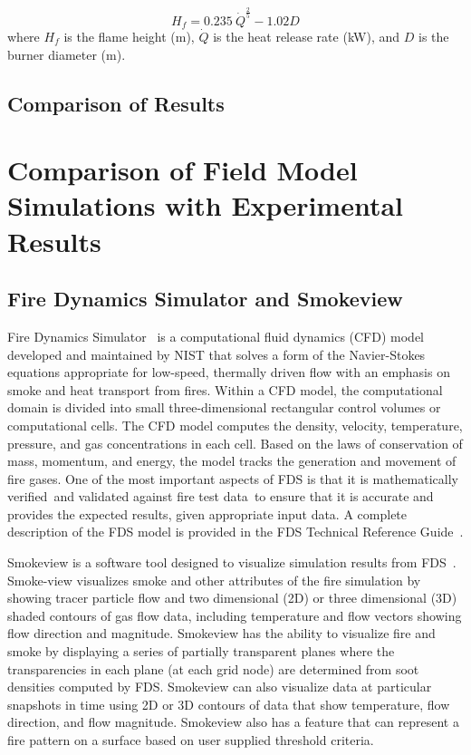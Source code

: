 \documentclass[twoside]{uocthesis}
\begin{document}
\begin{equation}\label{eq:flame_height}
H_f = 0.235\: \dot{Q}^{\frac{2}{5}} - 1.02 D
\end{equation}
where $H_{f}$ is the flame height (m), $\dot{Q}$ is the heat release rate (kW), and $D$ is the burner diameter (m).


\section{Comparison of Results}

\chapter{Comparison of Field Model Simulations with Experimental Results}

\section{Fire Dynamics Simulator and Smokeview}

Fire Dynamics Simulator~\cite{FDS_Users_Guide} is a computational fluid dynamics (CFD) model developed and maintained by NIST that solves a form of the Navier-Stokes equations appropriate for low-speed, thermally driven flow with an emphasis on smoke and heat transport from fires. Within a CFD model, the computational domain is divided into small three-dimensional rectangular control volumes or computational cells. The CFD model computes the density, velocity, temperature, pressure, and gas concentrations in each cell. Based on the laws of conservation of mass, momentum, and energy, the model tracks the generation and movement of fire gases. One of the most important aspects of FDS is that it is mathematically verified~\cite{FDS_Verification_Guide}and validated against fire test data~\cite{FDS_Validation_Guide}to ensure that it is accurate and provides the expected results, given appropriate input data. A complete description of the FDS model is provided in the FDS Technical Reference Guide~\cite{FDS_Tech_Guide}.

Smokeview is a software tool designed to visualize simulation results from FDS~\cite{Smokeview_Users_Guide}. Smoke-view visualizes smoke and other attributes of the fire simulation by showing tracer particle flow and two dimensional (2D) or three dimensional (3D) shaded contours of gas flow data, including temperature and flow vectors showing flow direction and magnitude. Smokeview has the ability to visualize fire and smoke by displaying a series of partially transparent planes where the transparencies in each plane (at each grid node) are determined from soot densities computed by FDS. Smokeview can also visualize data at particular snapshots in time using 2D or 3D contours of data that show temperature, flow direction, and flow magnitude.  Smokeview also has a feature that can represent a fire pattern on a surface based on user supplied threshold criteria.
\end{document}
